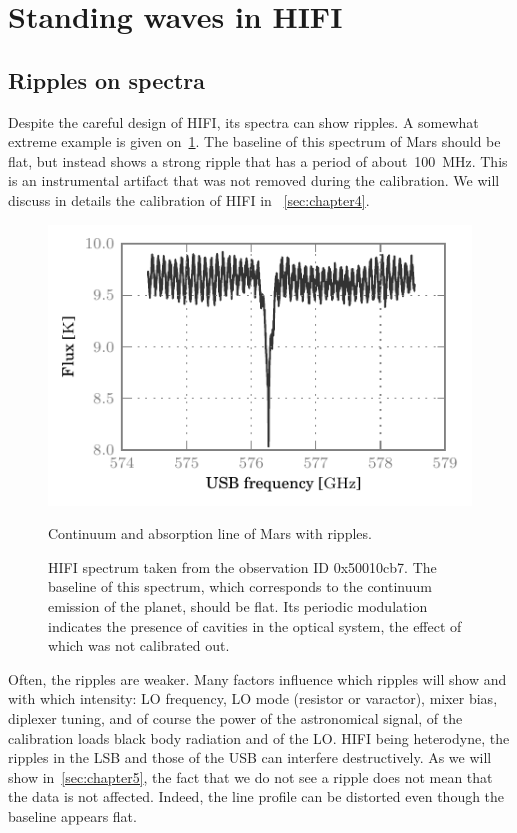 

\section{Standing waves in HIFI}

\subsection{Ripples on spectra}
Despite the careful design of HIFI, its spectra can show ripples.
A somewhat extreme example is given on~\cref{fig:mars_50010cb7_WBSH_USB}.
The baseline of this spectrum of Mars should be flat, but instead shows a strong ripple that has a period of about~\SI{100}{\mega\hertz}.
This is an instrumental artifact that was not removed during the calibration.
We will discuss in details the calibration of HIFI in%
~\cref{sec:chapter4}.

\begin{figure}[htbp]
    \centering
    \includegraphics[width=.8\textwidth]{mars_50010cb7_WBSH_USB}
    \caption{Continuum and absorption line of Mars with ripples.}
    \caption*{
        HIFI spectrum taken from the observation ID 0x50010cb7.
        The baseline of this spectrum, which corresponds to the continuum emission of the planet, should be flat.
        Its periodic modulation indicates the presence of cavities in the optical system, the effect of which was not calibrated out.
    }
    \label{fig:mars_50010cb7_WBSH_USB}
\end{figure}

Often, the ripples are weaker.
Many factors influence which ripples will show and with which intensity: LO frequency, LO mode (resistor or varactor), mixer bias, diplexer tuning, and of course the power of the astronomical signal, of the calibration loads black body radiation and of the LO.
HIFI being heterodyne, the ripples in the LSB and those of the USB can interfere destructively.
As we will show in~\cref{sec:chapter5}, the fact that we do not see a ripple does not mean that the data is not affected.
Indeed, the line profile can be distorted even though the baseline appears flat.


